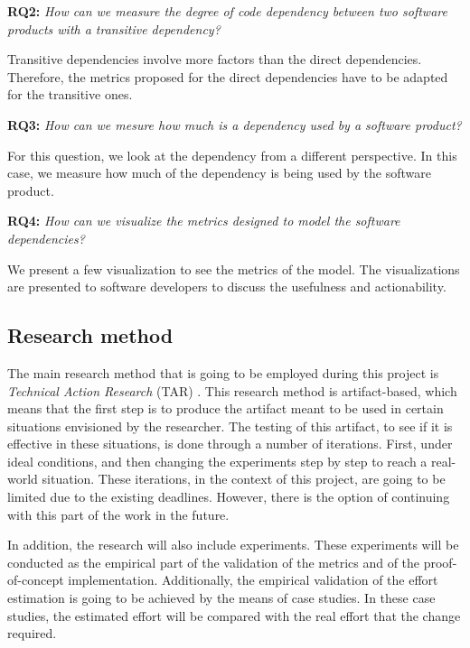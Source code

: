 \blankl
\textbf{RQ2:} \textit{How can we measure the degree of code dependency between two software products with a transitive dependency?} 

\blankls
Transitive dependencies involve more factors than the direct dependencies. Therefore, the metrics proposed for the direct dependencies have to be adapted for the transitive ones.

\blankl
\textbf{RQ3:} \textit{How can we mesure how much is a dependency used by a software product?}

\blankls
For this question, we look at the dependency from a different perspective. In this case, we measure how much of the dependency is being used by the software product.

\blankl
\textbf{RQ4:} \textit{How can we visualize the metrics designed to model the software dependencies?}

\blankls
We present a few visualization to see the metrics of the model. The visualizations are presented to software developers to discuss the usefulness and actionability.

\subsection{Research method}
The main research method that is going to be employed during this project is \textit{Technical Action Research} (TAR) \cite{wieringa2012technical}.
This research method is artifact-based, which means that the first step is to produce the artifact meant to be used in certain situations envisioned by the researcher. The testing of this artifact, to see if it is effective in these situations, is done through a number of iterations. First, under ideal conditions, and then changing the experiments step by step to reach a real-world situation. These iterations, in the context of this project, are going to be limited due to the existing deadlines. However, there is the option of continuing with this part of the work in the future.

\blankl
In addition, the research will also include experiments. These experiments will be conducted as the empirical part of the validation of the metrics and of the proof-of-concept implementation. Additionally, the empirical validation of the effort estimation is going to be achieved by the means of case studies. In these case studies, the estimated effort will be compared with the real effort that the change required. 

